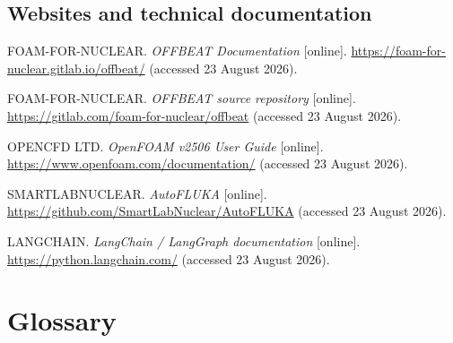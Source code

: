 \documentclass[12pt,a4paper]{report}
\begin{document}
\section*{Websites and technical documentation}

\begin{list}{}{\setlength{\leftmargin}{1cm}\setlength{\itemindent}{-1cm}}

\item
FOAM-FOR-NUCLEAR. \textit{OFFBEAT Documentation} [online].
\url{https://foam-for-nuclear.gitlab.io/offbeat/}
(accessed 23 August 2026).

\item
FOAM-FOR-NUCLEAR. \textit{OFFBEAT source repository} [online].
\url{https://gitlab.com/foam-for-nuclear/offbeat}
(accessed 23 August 2026).

\item
OPENCFD LTD. \textit{OpenFOAM v2506 User Guide} [online].
\url{https://www.openfoam.com/documentation/}
(accessed 23 August 2026).

\item
SMARTLABNUCLEAR. \textit{AutoFLUKA} [online].
\url{https://github.com/SmartLabNuclear/AutoFLUKA}
(accessed 23 August 2026).

\item
LANGCHAIN. \textit{LangChain / LangGraph documentation} [online].
\url{https://python.langchain.com/}
(accessed 23 August 2026).

\end{list}


\clearpage

\chapter*{Glossary}

\vspace{0.4cm}
\end{document}
